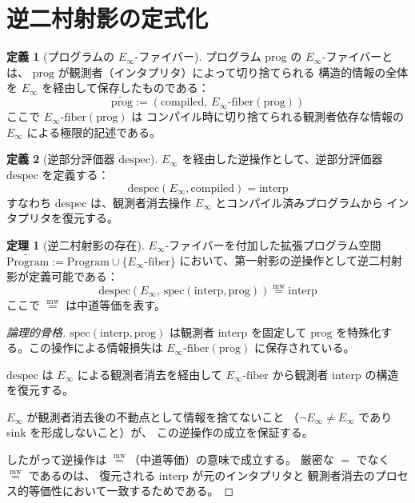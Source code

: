 \documentclass[11pt,a4paper]{article}
\newcommand{\mweq}{\mathrel{\overset{\mathrm{mw}}{=}}}
\newcommand{\Einfty}{E_\infty}
\theoremstyle{definition}
\newtheorem{definition}{定義}[section]
\newtheorem{theorem}{定理}[section]
\begin{document}
\section{逆二村射影の定式化}

\begin{definition}[プログラムの $\Einfty$-ファイバー]
プログラム $\text{prog}$ の $\Einfty$-ファイバーとは、
$\text{prog}$ が観測者（インタプリタ）によって切り捨てられる
構造的情報の全体を $\Einfty$ を経由して保存したものである：
$$\widetilde{\text{prog}} := (\text{compiled},\, \Einfty\text{-fiber}(\text{prog}))$$
ここで $\Einfty\text{-fiber}(\text{prog})$ は
コンパイル時に切り捨てられる観測者依存な情報の
$\Einfty$ による極限的記述である。
\end{definition}

\begin{definition}[逆部分評価器 $\mathrm{despec}$]
$\Einfty$ を経由した逆操作として、逆部分評価器 $\mathrm{despec}$ を定義する：
$$\mathrm{despec}(\Einfty, \text{compiled}) = \text{interp}$$
すなわち $\mathrm{despec}$ は、観測者消去操作 $\Einfty$ とコンパイル済みプログラムから
インタプリタを復元する。
\end{definition}

\begin{theorem}[逆二村射影の存在]
$\Einfty$-ファイバーを付加した拡張プログラム空間
$\widetilde{\mathrm{Program}} := \mathrm{Program} \cup \{\Einfty\text{-fiber}\}$
において、第一射影の逆操作として逆二村射影が定義可能である：
$$\mathrm{despec}(\Einfty,\, \mathrm{spec}(\text{interp}, \text{prog})) \mweq \text{interp}$$
ここで $\mweq$ は中道等価を表す。
\end{theorem}

\begin{proof}[論理的骨格]
$\mathrm{spec}(\text{interp}, \text{prog})$ は観測者 $\text{interp}$ を固定して
$\text{prog}$ を特殊化する。この操作による情報損失は
$\Einfty\text{-fiber}(\text{prog})$ に保存されている。

$\mathrm{despec}$ は $\Einfty$ による観測者消去を経由して
$\Einfty\text{-fiber}$ から観測者 $\text{interp}$ の構造を復元する。

$\Einfty$ が観測者消去後の不動点として情報を捨てないこと
（$\neg \Einfty \neq \Einfty$ であり sink を形成しないこと）が、
この逆操作の成立を保証する。

したがって逆操作は $\mweq$（中道等価）の意味で成立する。
厳密な $=$ でなく $\mweq$ であるのは、
復元される $\text{interp}$ が元のインタプリタと
観測者消去のプロセス的等価性において一致するためである。
\end{proof}
\end{document}
